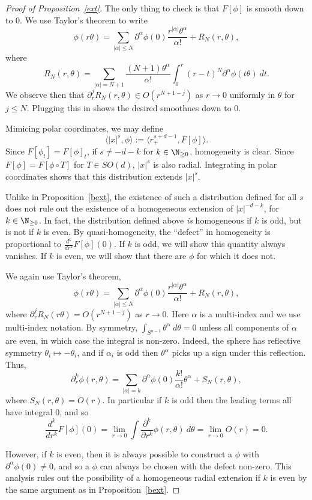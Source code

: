 \documentclass[12pt]{article}
\begin{document}
\begin{proof}[Proof of Proposition~\ref{ext}]
The only thing to check is that $F[\phi]$ is smooth down to $0$. We use Taylor's theorem to write
\[\phi(r\theta) = \sum_{|\alpha| \leq N} \partial^{\alpha}\phi(0)\frac{r^{|\alpha|}\theta^{\alpha}}{\alpha!} + R_N(r,\theta),\]
where
\[R_N(r,\theta) = \sum_{|\alpha| = N+1} \frac{(N+1)\theta^{\alpha}}{\alpha!}\int_0^r (r-t)^{N}\partial^{\alpha}\phi(t\theta)\ dt.\]
We observe then that $\partial_r^j R_N(r,\theta) \in O(r^{N+1-j})$ as $r \to 0$ uniformly in $\theta$ for $j \leq N$. Plugging this in shows the desired smoothnes down to $0$.


Mimicing polar coordinates, we may define
\[\langle |x|^s,\phi\rangle := \langle r_+^{s+d-1},F[\phi]\rangle.\] Since $F[\phi_t] = F[\phi]_t$, if $s \neq -d-k$ for $k \in \N_{\geq 0}$, homogeneity is clear. Since $F[\phi] = F[\phi\circ T]$ for $T \in SO(d)$, $|x|^s$ is also radial. Integrating in polar coordinates shows that this distribution extends $|x|^s$.


Unlike in Proposition~\ref{bext}, the existence of such a distribution defined for all $s$ does not rule out the existence of a homogeneous extension of $|x|^{-d-k}$, for $k \in \N_{\geq 0}$. In fact, the distribution defined above \emph{is} homogeneous if $k$ is odd, but is not if $k$ is even. By quasi-homogeneity, the ``defect'' in homogeneity is proportional to $\frac{d^k}{dr^k} F[\phi](0)$. If $k$ is odd, we will show this quantity always vanishes. If $k$ is even, we will show that there are $\phi$ for which it does not. 

We again use Taylor's theorem,
\[\phi(r\theta) = \sum_{|\alpha| \leq N} \partial^{\alpha}\phi(0)\frac{r^{|\alpha|}\theta^{\alpha}}{\alpha!} + R_N(r,\theta),\]
where $\partial_r^{j} R_N(r\theta) = O(r^{N+1-j})$ as $r \to 0$. Here $\alpha$ is a multi-index and we use multi-index notation. By symmetry, $\int_{S^{n-1}}\theta^{\alpha} \ d\theta = 0$ unless all components of $\alpha$ are even, in which case the integral is non-zero. Indeed, the sphere has reflective symmetry $\theta_i \mapsto -\theta_i$, and if $\alpha_i$ is odd then $\theta^{\alpha}$ picks up a sign under this reflection. Thus,
\[\partial_r^k\phi(r,\theta) = \sum_{|\alpha| = k}\partial^{\alpha}\phi(0)\frac{k!}{\alpha!}\theta^{\alpha} + S_N(r,\theta),\]
where $S_N(r,\theta) = O(r)$. In particular if $k$ is odd then the leading terms all have integral $0$, and so 
\[\frac{d^k}{dr^k}F[\phi](0) = \lim_{r \to 0} \int \frac{\partial^k}{\partial r^k} \phi(r,\theta)\ d\theta = \lim_{r \to 0} O(r) = 0.\]

However, if $k$ is even, then it is always possible to construct a $\phi$ with $\partial^{\alpha} \phi(0) \neq 0$, and so a $\phi$ can always be chosen with the defect non-zero. This analysis rules out the possibility of a homogeneous radial extension if $k$ is even by the same argument as in Proposition~\ref{bext}.


\end{proof}
\end{document}
